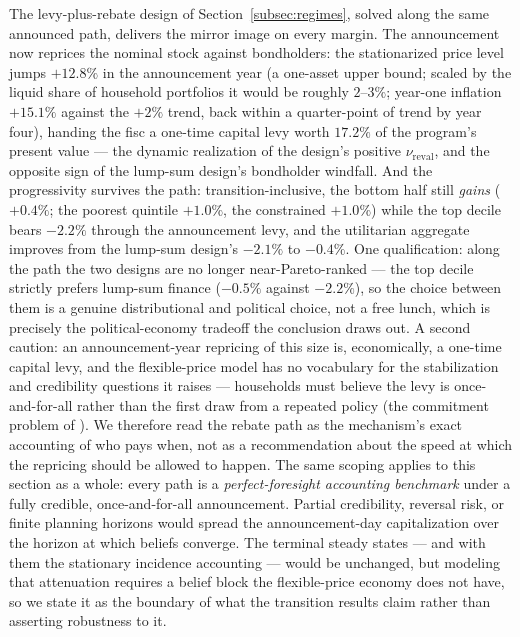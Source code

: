 \documentclass[12pt]{article}
\begin{document}
The levy-plus-rebate design of Section~\ref{subsec:regimes}, solved along
the same announced path, delivers the mirror image on every margin. The
announcement now reprices the nominal stock against bondholders:
the stationarized price level jumps $+12.8\%$ in the announcement year
(a one-asset upper bound; scaled by the liquid share of household
portfolios it would be roughly $2$--$3\%$; year-one
inflation $+15.1\%$ against the $+2\%$ trend, back within a
quarter-point of trend by year four), handing the fisc a one-time capital
levy worth $17.2\%$ of the program's present value --- the dynamic
realization of the design's positive $\nu_{\mathrm{reval}}$, and the
opposite sign of the lump-sum design's bondholder windfall. And the
progressivity survives the path: transition-inclusive, the bottom half
still \emph{gains} ($+0.4\%$; the poorest quintile $+1.0\%$, the
constrained $+1.0\%$) while the top decile bears $-2.2\%$ through the
announcement levy, and the utilitarian aggregate improves from the lump-sum
design's $-2.1\%$ to $-0.4\%$. One qualification: along the path
the two designs are no longer near-Pareto-ranked --- the top decile
strictly prefers lump-sum finance ($-0.5\%$ against $-2.2\%$), so the
choice between them is a genuine distributional and political choice, not
a free lunch, which is precisely the political-economy tradeoff the
conclusion draws out. A second caution: an announcement-year repricing of
this size is, economically, a one-time capital levy, and the flexible-price
model has no vocabulary for the stabilization and credibility questions it
raises --- households must believe the levy is once-and-for-all rather than
the first draw from a repeated policy (the commitment problem of
\citealp{hurtado2023sovereign}). We therefore read the rebate path as the
mechanism's exact accounting of who pays when, not as a recommendation
about the speed at which the repricing should be allowed to happen. The
same scoping applies to this section as a whole: every path is a
\emph{perfect-foresight accounting benchmark} under a fully credible,
once-and-for-all announcement. Partial credibility, reversal risk, or
finite planning horizons would spread the announcement-day capitalization
over the horizon at which beliefs converge. The terminal steady states ---
and with them the stationary incidence accounting --- would be unchanged,
but modeling that attenuation requires a belief block the flexible-price
economy does not have, so we state it as the boundary of what the
transition results claim rather than asserting robustness to it.
\end{document}
